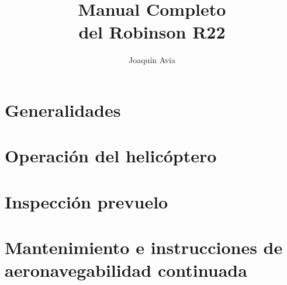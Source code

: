 \documentclass[11pt,twoside,openright]{memoir}
\title{Manual Completo\\del Robinson R22}
\author{Joaquín Avia}
\begin{document}
\frontmatter
\aviatitlepage

\tableofcontents*


\mainmatter
\part{Generalidades}


\part{Operación del helicóptero}










\part{Inspección prevuelo}



\part{Mantenimiento e instrucciones de aeronavegabilidad continuada}














\appendix



\backmatter
\printbibliography[heading=bibintoc,title={Fuentes}]
\end{document}
